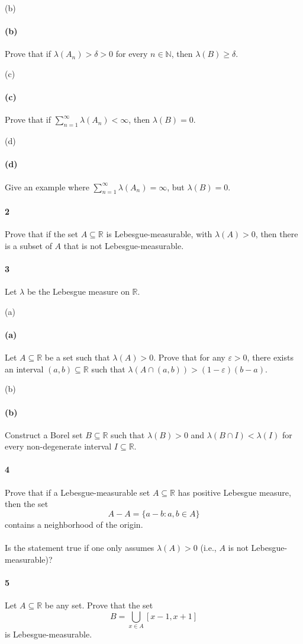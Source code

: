 \documentclass[12pt]{article}
\newlength{\myparskip}
\newenvironment{fullbox}{\begin{lrbox}{\savefullbox}\begin{minipage}{\dimexpr\textwidth-2\fboxsep\relax}\setlength{\parskip}{\myparskip}}{\end{minipage}\end{lrbox}\framebox[\textwidth]{\usebox{\savefullbox}}}
\newenvironment{pbox}[1][]{\begin{fullbox}\ifx#1\empty\else\paragraph{#1}\phantom{}\fi}{\end{fullbox}}
\theoremstyle{definition}
\newcommand{\N}{\mathbb{N}}
\newcommand{\R}{\mathbb{R}}
\newcommand{\eps}{\varepsilon}
\newcommand{\<}{\langle}
\renewcommand{\>}{\rangle}
\begin{document}
\begin{pbox}[(b)]
    Prove that if $\lambda(A_n) > \delta > 0$ for every $n \in \N$, then $\lambda(B) \geq \delta$.
\end{pbox}

\begin{pbox}[(c)]
    Prove that if $\sum_{n=1}^{\infty} \lambda(A_n) < \infty$, then $\lambda(B) = 0$.
\end{pbox}

\begin{pbox}[(d)]
    Give an example where $\sum_{n=1}^{\infty} \lambda(A_n) = \infty$, but $\lambda(B) = 0$.
\end{pbox}

\begin{pbox}[2]
    Prove that if the set $A \subseteq \R$ is Lebesgue-measurable, with $\lambda(A) > 0$, then there is a subset of $A$ that is not Lebesgue-measurable.
\end{pbox}


\begin{pbox}[3]
    Let $\lambda$ be the Lebesgue measure on $\R$.
\end{pbox}

\begin{pbox}[(a)]
    Let $A \subseteq \R$ be a set such that $\lambda(A) > 0$. Prove that for any $\eps > 0$, there exists an interval $(a, b) \subseteq \R$ such that $\lambda(A \cap (a, b)) > (1 - \eps)(b - a)$.
\end{pbox}

\begin{pbox}[(b)]
    Construct a Borel set $B \subseteq \R$ such that $\lambda(B) > 0$ and $\lambda(B \cap I) < \lambda(I)$ for every non-degenerate interval $I \subseteq \R$.
\end{pbox}

\begin{pbox}[4]
    Prove that if a Lebesgue-measurable set $A \subseteq \R$ has positive Lebesgue measure, then the set
    \[
        A - A = \{a - b : a, b \in A\}
    \]
    contains a neighborhood of the origin.
\end{pbox}

\begin{pbox}
    Is the statement true if one only assumes $\lambda(A) > 0$ (i.e., $A$ is not Lebesgue-measurable)?
\end{pbox}

\begin{pbox}[5]
    Let $A \subseteq \R$ be any set. Prove that the set
    \[
        B = \bigcup_{x \in A} [x - 1, x + 1]
    \]
    is Lebesgue-measurable.
\end{pbox}
\end{document}
